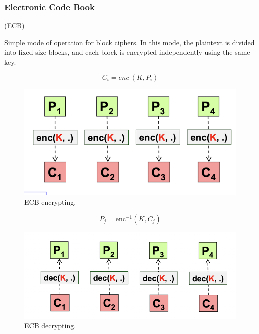 \subsubsection{Electronic Code Book}
\begin{center}
    (ECB)
\end{center}

Simple mode of operation for block ciphers. In this mode, the plaintext is divided into fixed-size blocks, and each block is encrypted independently using the same key.

\begin{multicols}{2}
    \begin{equation*}
        \boxed{C_i = enc \ (K, P_i)}
    \end{equation*}
    \begin{figure}[H]
        \includegraphics[width=\linewidth]{Images/Cryptography/ECBEncrypt.png}
        \caption{ECB encrypting.}
    \end{figure}
    \columnbreak
    \begin{equation*}
        \boxed{P_j = \text{enc}^{-1}(K, C_j)}
    \end{equation*}
    \begin{figure}[H]
        \includegraphics[width=\linewidth]{Images/Cryptography/ECBDecrypt.png}
        \caption{ECB decrypting.}
    \end{figure}
\end{multicols}

